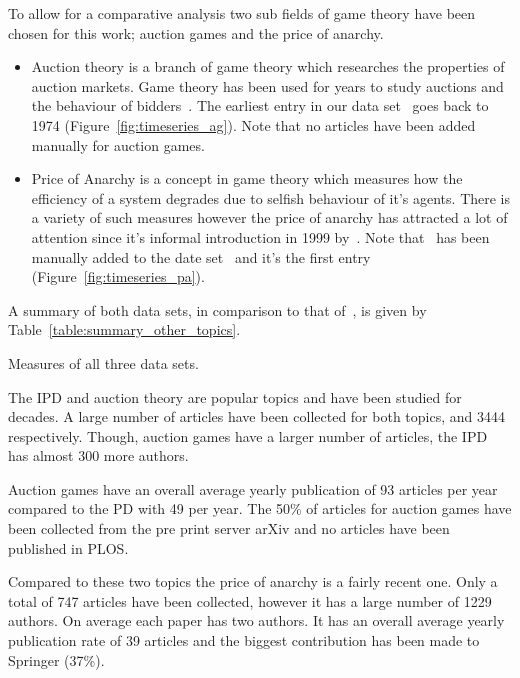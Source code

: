 \documentclass{article}
\theoremstyle{definition}
\newcommand{\totalarticles}{}
\begin{document}
To allow for a comparative analysis two sub fields of game theory have been chosen
for this work; auction games and the price of anarchy.

\begin{itemize}
    \item Auction theory is a branch of game theory which researches the
    properties of auction markets. Game theory has been used for years to study
    auctions and the behaviour of bidders~\cite{Shubik1971}. The earliest entry
    in our data set~\cite{auction_data_2018} goes back to 1974
    (Figure~\ref{fig:timeseries_ag}). Note that no articles have been added
    manually for auction games.
    \item Price of Anarchy is a concept in game theory which measures how the
    efficiency of a system degrades due to selfish behaviour of it's agents.
    There is a variety of such measures however the price of anarchy has
    attracted a lot of attention since it's informal introduction in 1999
    by~\cite{Koutsoupias1999}. Note that~\cite{Koutsoupias1999} has been
    manually added to the date set~\cite{anarchy_data_2018} and it's the first entry
    (Figure~\ref{fig:timeseries_pa}).
\end{itemize}

A summary of both data sets, in comparison to that of~\cite{pd_data_2018}, is
given by Table~\ref{table:summary_other_topics}.

\begin{table}[!hbtp]
    \centering
    \resizebox{\textwidth}{!}{
    }
    \caption{Measures of all three data sets.}\label{table:summary_other_topics}
\end{table}

The IPD and auction theory are popular topics and have
been studied for decades. A large number of articles have
been collected for both topics, \totalarticles and 3444 respectively. Though, auction
games have a larger number of articles, the IPD
has almost 300 more authors.

Auction games have an overall average yearly publication
of 93 articles per year compared to the PD with 49 per year. The 50\% of articles
for auction games have been collected from the pre print server arXiv and no articles have
been published in PLOS.

Compared to these two topics the price of anarchy is a fairly recent one. Only a
total of 747 articles have been collected, however it has a large number
of 1229 authors. On average each paper has two authors. It has an overall average
yearly publication rate of 39 articles and the biggest contribution has been made
to Springer (37\%).
\end{document}
